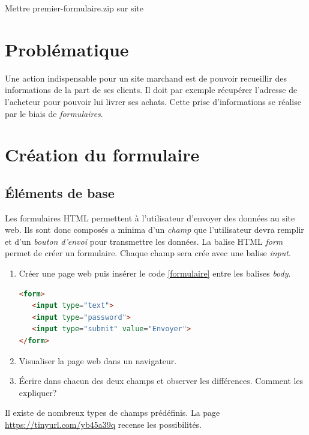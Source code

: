\documentclass[a4paper,11pt]{article}
\begin{document}
\begin{Form}
\begin{commentprof}
Mettre premier-formulaire.zip sur site
\end{commentprof}
\section{Problématique}
Une action indispensable pour un site marchand est de pouvoir recueillir des informations de la part de ses clients. Il doit par exemple récupérer l'adresse de l'acheteur pour pouvoir lui livrer ses achats. Cette prise d'informations se réalise par le biais de \emph{formulaires}.
\begin{center}
 \end{center}
\section{Création du formulaire}
\subsection{Éléments de base}
Les formulaires HTML permettent à l'utilisateur d'envoyer des données au site web. Ils sont donc composés a minima d'un \emph{champ} que l'utilisateur devra remplir et d'un \emph{bouton d'envoi} pour transmettre les données. La balise HTML \emph{form} permet de créer un formulaire. Chaque champ sera crée avec une balise \emph{input}.
\begin{activite}
\begin{enumerate}
\item Créer une page web puis insérer le code \ref{formulaire} entre les balises \emph{body}.
\begin{center}
\begin{lstlisting}[language=HTML]
<form>
   <input type="text">
   <input type="password">
   <input type="submit" value="Envoyer">
</form>
\end{lstlisting}
\label{formulaire}
\end{center}
\item Visualiser la page web dans un navigateur.
\item Écrire dans chacun des deux champs et observer les différences. Comment les expliquer?
\end{enumerate}
\end{activite}
Il existe de nombreux types de champs prédéfinis. La page \mbox{\url{https://tinyurl.com/yb45a39q}} recense les possibilités.

\end{Form}
\end{document}

